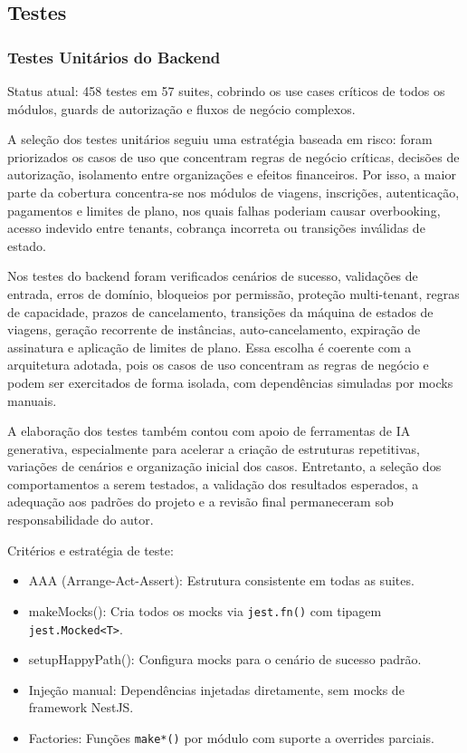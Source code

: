 \subsection{Testes}
\label{subsec:verificacao}

\subsubsection{Testes Unitários do Backend}

Status atual: 458 testes em 57 suites, cobrindo os use cases críticos de todos os módulos, guards de autorização e fluxos de negócio complexos.

A seleção dos testes unitários seguiu uma estratégia baseada em risco: foram priorizados os casos de uso que concentram regras de negócio críticas, decisões de autorização, isolamento entre organizações e efeitos financeiros. Por isso, a maior parte da cobertura concentra-se nos módulos de viagens, inscrições, autenticação, pagamentos e limites de plano, nos quais falhas poderiam causar overbooking, acesso indevido entre tenants, cobrança incorreta ou transições inválidas de estado.

Nos testes do backend foram verificados cenários de sucesso, validações de entrada, erros de domínio, bloqueios por permissão, proteção multi-tenant, regras de capacidade, prazos de cancelamento, transições da máquina de estados de viagens, geração recorrente de instâncias, auto-cancelamento, expiração de assinatura e aplicação de limites de plano. Essa escolha é coerente com a arquitetura adotada, pois os casos de uso concentram as regras de negócio e podem ser exercitados de forma isolada, com dependências simuladas por mocks manuais.

A elaboração dos testes também contou com apoio de ferramentas de IA generativa, especialmente para acelerar a criação de estruturas repetitivas, variações de cenários e organização inicial dos casos. Entretanto, a seleção dos comportamentos a serem testados, a validação dos resultados esperados, a adequação aos padrões do projeto e a revisão final permaneceram sob responsabilidade do autor.

Critérios e estratégia de teste:
\begin{itemize}
\item AAA (Arrange-Act-Assert): Estrutura consistente em todas as suites.
\item makeMocks(): Cria todos os mocks via \texttt{jest.fn()} com tipagem \texttt{jest.Mocked<T>}.
\item setupHappyPath(): Configura mocks para o cenário de sucesso padrão.
\item Injeção manual: Dependências injetadas diretamente, sem mocks de framework NestJS.
\item Factories: Funções \texttt{make*()} por módulo com suporte a overrides parciais.
\end{itemize}

